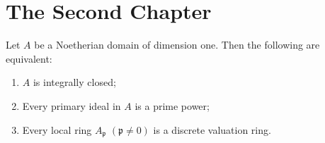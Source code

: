 \chapter{The Second Chapter}
\label{sec:second}

\kant[7-11] %

\begin{theorem}[{\cite[95]{AM69}}]
    \label{thm:dedekind}
    Let \( A \) be a Noetherian domain of dimension one. Then the following are equivalent:
    \begin{enumerate}
        \item \( A \) is integrally closed;
        \item Every primary ideal in \( A \) is a prime power;
        \item Every local ring \( A_\mathfrak{p} \) \( (\mathfrak{p} \neq 0) \) is a discrete valuation ring.
    \end{enumerate}
\end{theorem}